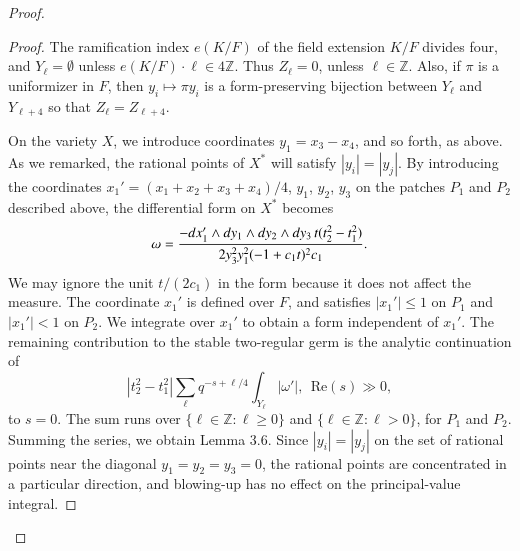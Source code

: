 \documentclass{amsart}
\newcommand\Z{{\mathbb Z}}
\begin{document}
\begin{proof}
\noindent
\begin{proof} The ramification index
$e(K/F)$ of the field extension $K/F$
divides four, and $Y_{\ell}=\emptyset$
unless $e(K/F)\cdot\ell\in {4}\Z$.
Thus $Z_\ell=0$, unless $\ell\in \Z$.
  Also, if $\pi$ is a uniformizer
in $F$, then $y_i\mapsto \pi y_i$ is a 
form-preserving bijection between
$Y_\ell$ and $Y_{\ell+4}$ so that $Z_\ell=Z_{\ell+4}$.

On the variety $X$, we introduce coordinates $y_1=x_3-x_4$, 
and so forth, as above.  As we remarked, the rational points
of $X^*$ will satisfy $|y_i|=|y_j|$.  By introducing the
coordinates $x_1' = (x_1+x_2+x_3+x_4)/4$, $y_1$, $y_2$, $y_3$
on the patches $P_1$ and $P_2$ described above, the 
differential form on $X^*$ 
becomes
$$\omega = {-dx_1'\wedge dy_1\wedge dy_2 \wedge dy_3 \, 
          t (t_2^2-t_1^2)\over
          2 y_3^2 y_1^2 (-1 + c_1 t)^2 c_1}.$$
We may ignore the unit $t/(2c_1)$ in the form because it does
not affect the measure.  The coordinate $x_1'$ is defined over
$F$, and satisfies $|x_1'|\le 1$ on $P_1$ and $|x_1'|<1$ on
$P_2$.  We integrate over $x_1'$ to obtain a form independent
of $x_1'$.  The remaining contribution to the stable
two-regular germ is the analytic continuation of
$$
|t_2^2-t_1^2|\sum_\ell q^{-s+\ell/4} \int_{Y_\ell}
|\omega'|,
\ \ \text{Re}(s)\gg 0,$$
to $s=0$.  The sum runs over $\{\ell\in \Z: \ell\ge 0\}$
and $\{\ell\in \Z:\ell > 0\}$, for $P_1$ and $P_2$.
Summing the series, we obtain Lemma 3.6.
Since $|y_i|=|y_j|$
on the set of rational points near the diagonal $y_1=y_2=y_3=0$,
the rational points are concentrated in a particular direction,
and blowing-up has no effect on the principal-value integral.
\end{proof}


\end{proof}
\end{document}
